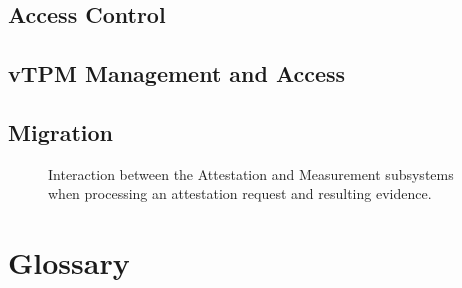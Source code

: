 \documentclass[10pt]{article}
\begin{document}
\subsection{Access Control}

\subsection{vTPM Management and Access}

\subsection{Migration}

\begin{figure}
\centering 
{}
  \caption{Interaction between the Attestation and Measurement
    subsystems when processing an attestation request and resulting evidence.}
  \label{fig:ap}
\end{figure}

\appendix

\section{Glossary}



\end{document}
